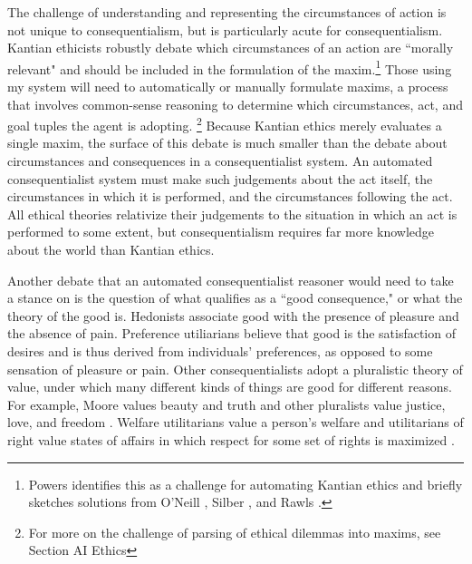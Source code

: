 \begin{isabellebody}
\begin{isamarkuptext}
The challenge of understanding and representing the circumstances of action is not unique to consequentialism,
but is particularly acute for consequentialism. Kantian ethicists robustly debate which circumstances 
of an action are ``morally relevant" and should be included in the formulation of the maxim.\footnote{Powers 
\cite{powers} identifies this as a challenge for automating Kantian ethics and briefly sketches 
solutions from O'Neill \cite{constofreason}, Silber \cite{silber}, and Rawls \cite{rawlsconstructivism}. } Those 
using my system will need to automatically or manually formulate maxims, a process that involves 
common-sense reasoning to determine which circumstances, act, and goal tuples the agent is adopting.
\footnote{For more on the challenge of parsing of ethical dilemmas into maxims, see Section AI Ethics}
Because Kantian ethics merely evaluates a single maxim, the surface of this debate is much smaller
than the debate about circumstances and consequences in a consequentialist system. An automated 
consequentialist system must make such judgements about the act itself, the circumstances in which 
it is performed, and the circumstances following the act. All ethical theories relativize
their judgements to the situation in which an act is performed to some extent, but consequentialism
requires far more knowledge about the world than Kantian ethics.%
\end{isamarkuptext}\isamarkuptrue%
%
\isadelimdocument
%
\endisadelimdocument
%
\isatagdocument
%
\isamarkuptrue%
%
\endisatagdocument
{\isafolddocument}%
%
\isadelimdocument
%
\endisadelimdocument
%
\begin{isamarkuptext}%
Another debate that an automated consequentialist reasoner would need to take a stance on is
the question of what qualifies as a ``good consequence," or what the theory of the good is. Hedonists associate
good with the presence of pleasure and the absence of pain. Preference utiliarians believe that good is 
the satisfaction of desires and is thus derived from individuals' preferences, as opposed to some
sensation of pleasure or pain. Other consequentialists adopt a pluralistic theory of value, under which 
many different kinds of things are good for different reasons. For example, Moore values beauty and truth 
and other pluralists value justice, love, and freedom \cite{moorepe}. Welfare utilitarians value a person's 
welfare and utilitarians of right value states of affairs in which respect for some set of
rights is maximized \cite{consequentialismsep}.


\end{isamarkuptext}
\end{isabellebody}

